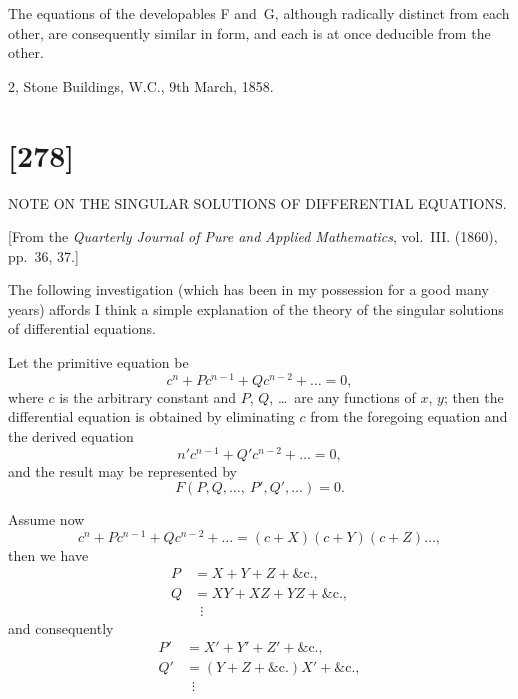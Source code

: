 \documentclass[12pt,a4paper]{article}
\theoremstyle{definition}
\begin{document}
The equations of the developables F and~G, although radically distinct from each
other, are consequently similar in form, and each is at once deducible from the other.

\begin{flushright}
2, Stone Buildings, W.C., 9th March, 1858.
\end{flushright}


\newpage
\section*{[278]}
\begin{center}
{\large NOTE ON THE SINGULAR SOLUTIONS OF DIFFERENTIAL EQUATIONS.}
\end{center}

[From the \textit{Quarterly Journal of Pure and Applied Mathematics}, vol.~III. (1860),
pp.~36, 37.]

The following investigation (which has been in my possession for a good many
years) affords I think a simple explanation of the theory of the singular solutions of
differential equations.

Let the primitive equation be
\[
c^{n} + Pc^{n-1} + Qc^{n-2} + \ldots = 0,
\]
where $c$ is the arbitrary constant and $P$, $Q$, \ldots\ are any functions of $x$, $y$; then the
differential equation is obtained by eliminating $c$ from the foregoing equation and the
derived equation
\[
n'c^{n-1} + Q'c^{n-2} + \ldots = 0,
\]
and the result may be represented by
\[
F(P, Q, \ldots,\ P', Q', \ldots) = 0.
\]

Assume now
\[
c^{n} + Pc^{n-1} + Qc^{n-2} + \ldots = (c + X)(c + Y)(c + Z)\ldots,
\]
then we have
\begin{align*}
P &= X + Y + Z + \&\mathrm{c}.,\\
Q &= XY + XZ + YZ + \&\mathrm{c}.,\\
&\ \;\vdots
\end{align*}
and consequently
\begin{align*}
P' &= X' + Y' + Z' + \&\mathrm{c}.,\\
Q' &= (Y + Z + \&\mathrm{c}.)X' + \&\mathrm{c}.,\\
&\ \;\vdots
\end{align*}
\end{document}
